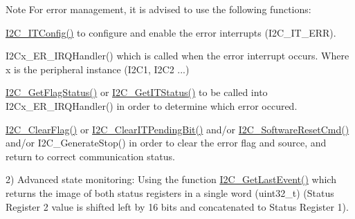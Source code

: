 \begin{DoxyItemize}
\begin{DoxyItemize}
\begin{DoxyNote}{Note}
For error management, it is advised to use the following functions\+:
\begin{DoxyItemize}
\item \hyperlink{agilefox_2library_2src_2stm32f10x__i2c_8c_a7a87692ee16d1d4ec7fcd88e24f0a197}{I2\+C\+\_\+\+I\+T\+Config()} to configure and enable the error interrupts (I2\+C\+\_\+\+I\+T\+\_\+\+E\+RR).
\item I2\+Cx\+\_\+\+E\+R\+\_\+\+I\+R\+Q\+Handler() which is called when the error interrupt occurs. Where x is the peripheral instance (I2\+C1, I2\+C2 ...)
\item \hyperlink{agilefox_2library_2src_2stm32f10x__i2c_8c_a9aefe6c49ded931ae087ff44a47b87f3}{I2\+C\+\_\+\+Get\+Flag\+Status()} or \hyperlink{agilefox_2library_2src_2stm32f10x__i2c_8c_a93e6ac0ec7f3d0adbcd7835fcb4431dc}{I2\+C\+\_\+\+Get\+I\+T\+Status()} to be called into I2\+Cx\+\_\+\+E\+R\+\_\+\+I\+R\+Q\+Handler() in order to determine which error occured.
\item \hyperlink{agilefox_2library_2src_2stm32f10x__i2c_8c_a8ac0c028a3f185e1b362aba36865e78e}{I2\+C\+\_\+\+Clear\+Flag()} or \hyperlink{agilefox_2library_2src_2stm32f10x__i2c_8c_a21e5d72db8f1d47f88d00f77cd85d2ae}{I2\+C\+\_\+\+Clear\+I\+T\+Pending\+Bit()} and/or \hyperlink{group___i2_c___exported___functions_ga1289c908aeb882443aba323b459c638b}{I2\+C\+\_\+\+Software\+Reset\+Cmd()} and/or I2\+C\+\_\+\+Generate\+Stop() in order to clear the error flag and source, and return to correct communication status.
\end{DoxyItemize}
\end{DoxyNote}
2) Advanced state monitoring\+: Using the function \hyperlink{group___i2_c___exported___functions_ga29237aea9b5a3ead33167e1d027e9f1a}{I2\+C\+\_\+\+Get\+Last\+Event()} which returns the image of both status registers in a single word (uint32\+\_\+t) (Status Register 2 value is shifted left by 16 bits and concatenated to Status Register 1).
\end{DoxyItemize}
\end{DoxyItemize}

